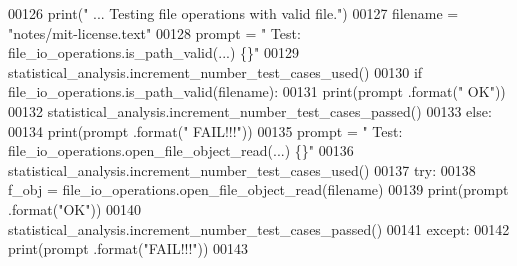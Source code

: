 \begin{DoxyCode}
00126         print(\textcolor{stringliteral}{" ... Testing file operations with valid file."})
00127         filename = \textcolor{stringliteral}{"notes/mit-license.text"}
00128         prompt = \textcolor{stringliteral}{"  Test: file\_io\_operations.is\_path\_valid(...) \{\}"}
00129         statistical\_analysis.increment\_number\_test\_cases\_used()
00130         \textcolor{keywordflow}{if} file\_io\_operations.is\_path\_valid(filename):
00131             print(prompt .format(\textcolor{stringliteral}{"  OK"}))
00132             statistical\_analysis.increment\_number\_test\_cases\_passed()
00133         \textcolor{keywordflow}{else}:
00134             print(prompt .format(\textcolor{stringliteral}{"  FAIL!!!"}))
00135         prompt = \textcolor{stringliteral}{"  Test: file\_io\_operations.open\_file\_object\_read(...) \{\}"}
00136         statistical\_analysis.increment\_number\_test\_cases\_used()
00137         \textcolor{keywordflow}{try}:
00138             f\_obj = file\_io\_operations.open\_file\_object\_read(filename)
00139             print(prompt .format(\textcolor{stringliteral}{"OK"}))
00140             statistical\_analysis.increment\_number\_test\_cases\_passed()
00141         \textcolor{keywordflow}{except}:
00142             print(prompt .format(\textcolor{stringliteral}{"FAIL!!!"}))
00143         
\end{DoxyCode}
